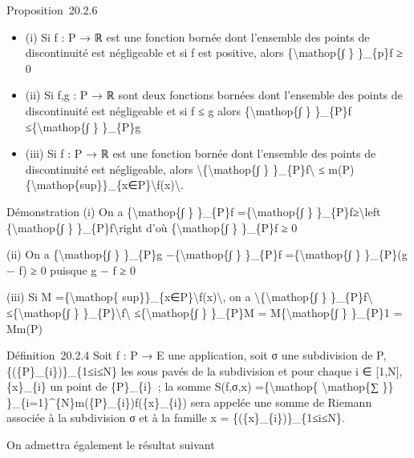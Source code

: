 \documentclass[]{article}
\begin{document}
Proposition~20.2.6

\begin{itemize}
\itemsep1pt\parskip0pt
\item
  (i) Si f : P → ℝ est une fonction bornée dont l'ensemble des points de
  discontinuité est négligeable et si f est positive, alors
  \{\textbackslash{}mathop\{∫ \} \}\_\{p\}f ≥ 0
\item
  (ii) Si f,g : P → ℝ sont deux fonctions bornées dont l'ensemble des
  points de discontinuité est négligeable et si f ≤ g alors
  \{\textbackslash{}mathop\{∫ \} \}\_\{P\}f ≤\{\textbackslash{}mathop\{∫
  \} \}\_\{P\}g
\item
  (iii) Si f : P → ℝ est une fonction bornée dont l'ensemble des points
  de discontinuité est négligeable, alors
  \textbackslash{}\textbar{}\{\textbackslash{}mathop\{∫ \}
  \}\_\{P\}f\textbackslash{}\textbar{} ≤
  m(P)\{\textbackslash{}mathop\{sup\}\}\_\{x∈P\}\textbackslash{}\textbar{}f(x)\textbackslash{}\textbar{}.
\end{itemize}

Démonstration (i) On a \{\textbackslash{}mathop\{∫ \} \}\_\{P\}f
=\{\textbackslash{}mathop\{∫ \}
\}\_\{P\}\textbar{}f\textbar{}≥\textbackslash{}left
\textbar{}\{\textbackslash{}mathop\{∫ \} \}\_\{P\}f\textbackslash{}right
\textbar{} d'où \{\textbackslash{}mathop\{∫ \} \}\_\{P\}f ≥ 0

(ii) On a \{\textbackslash{}mathop\{∫ \} \}\_\{P\}g
−\{\textbackslash{}mathop\{∫ \} \}\_\{P\}f =\{\textbackslash{}mathop\{∫
\} \}\_\{P\}(g − f) ≥ 0 puisque g − f ≥ 0

(iii) Si M =\{\textbackslash{}mathop\{
sup\}\}\_\{x∈P\}\textbackslash{}\textbar{}f(x)\textbackslash{}\textbar{},
on a \textbackslash{}\textbar{}\{\textbackslash{}mathop\{∫ \}
\}\_\{P\}f\textbackslash{}\textbar{} ≤\{\textbackslash{}mathop\{∫ \}
\}\_\{P\}\textbackslash{}\textbar{}f\textbackslash{}\textbar{}
≤\{\textbackslash{}mathop\{∫ \} \}\_\{P\}M =
M\{\textbackslash{}mathop\{∫ \} \}\_\{P\}1 = Mm(P)

Définition~20.2.4 Soit f : P → E une application, soit σ une subdivision
de P, \{(\{P\}\_\{i\})\}\_\{1≤i≤N\} les sous pavés de la subdivision et
pour chaque i ∈ {[}1,N{]}, \{x\}\_\{i\} un point de \{P\}\_\{i\}~; la
somme S(f,σ,x) =\{\textbackslash{}mathop\{ \textbackslash{}mathop\{∑
\}\} \}\_\{i=1\}\^{}\{N\}m(\{P\}\_\{i\})f(\{x\}\_\{i\}) sera appelée une
somme de Riemann associée à la subdivision σ et à la famille x =
\{(\{x\}\_\{i\})\}\_\{1≤i≤N\}.

On admettra également le résultat suivant
\end{document}

